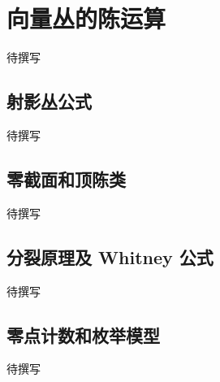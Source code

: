 
% 
% 

\section{向量丛的陈运算}
\label{g5:sec:2703}

待撰写

\subsection{射影丛公式}
\label{g5:subsec:2703:01}
待撰写

\subsection{零截面和顶陈类}
\label{g5:subsec:2703:02}
待撰写

\subsection{分裂原理及 Whitney 公式}
\label{g5:subsec:2703:03}
待撰写

\subsection{零点计数和枚举模型}
\label{g5:subsec:2703:04}
待撰写
